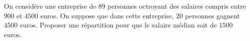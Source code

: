 
\begin{exercice}\label{exoSeconde-0016}

On considère une entreprise de \( 89\) personnes octroyant des salaires compris entre $900$ et $4500$ euros. On suppose que dans cette entreprise, $20$ personnes gagnent $4500$ euros. Proposer une répartition pour que le salaire médian soit de $1500$ euros.


\end{exercice}
